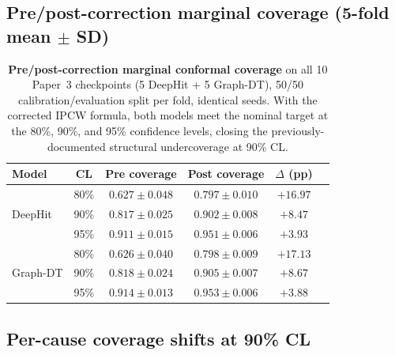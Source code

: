 \documentclass[11pt]{article}
\begin{document}
\subsection*{Pre/post-correction marginal coverage (5-fold mean $\pm$ SD)}

\begin{table}[h!]
\centering
\caption{\textbf{Pre/post-correction marginal conformal coverage} on all 10 Paper~3 checkpoints (5 DeepHit + 5 Graph-DT), 50/50 calibration/evaluation split per fold, identical seeds. With the corrected IPCW formula, both models meet the nominal target at the 80\%, 90\%, and 95\% confidence levels, closing the previously-documented structural undercoverage at 90\% CL.}
\label{tab:scrita_marginal}
\begin{tabular}{lccccc}
\toprule
\textbf{Model} & \textbf{CL} & \textbf{Pre coverage} & \textbf{Post coverage} & \textbf{$\Delta$ (pp)} \\
\midrule
\multirow{3}{*}{DeepHit}
  & 80\% & $0.627 \pm 0.048$ & $0.797 \pm 0.010$ & $+16.97$ \\
  & 90\% & $0.817 \pm 0.025$ & $0.902 \pm 0.008$ & $+8.47$  \\
  & 95\% & $0.911 \pm 0.015$ & $0.951 \pm 0.006$ & $+3.93$  \\
\midrule
\multirow{3}{*}{Graph-DT}
  & 80\% & $0.626 \pm 0.040$ & $0.798 \pm 0.009$ & $+17.13$ \\
  & 90\% & $0.818 \pm 0.024$ & $0.905 \pm 0.007$ & $+8.67$  \\
  & 95\% & $0.914 \pm 0.013$ & $0.953 \pm 0.006$ & $+3.88$  \\
\bottomrule
\end{tabular}
\end{table}

\subsection*{Per-cause coverage shifts at 90\% CL}
\end{document}
